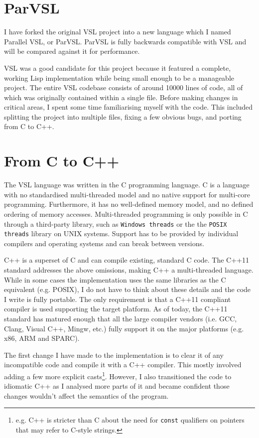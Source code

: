 \section{ParVSL}
I have forked the original VSL project into a new language which I named Parallel VSL, or ParVSL.
ParVSL is fully backwards compatible with VSL and will be compared against it for performance.

VSL was a good candidate for this project because it featured a complete, working Lisp implementation while being
small enough to be a manageable project. The entire VSL codebase consists of around 10000 lines of code, all of which
was originally contained within a single file. Before making changes in critical areas, I spent some time familiarising
myself with the code. This included splitting the project into multiple files, fixing a few obvious bugs, and porting
from C to C++.

\section{From C to C++}
The VSL language was written in the C programming language. C is a language with no standardised
multi-threaded model and no native support for multi-core programming. Furthermore, it has no well-defined
memory model, and no defined ordering of memory accesses. Multi-threaded programming
is only possible in C through a third-party library, such as \texttt{Windows threads} or the
the \texttt{POSIX threads} library on UNIX systems. Support has to be provided by individual compilers
and operating systems and can break between versions.

C++ is a superset of C and can compile existing, standard C code. The C++11 standard addresses the
above omissions, making C++ a multi-threaded language. While in some cases the implementation uses the same
libraries as the C equivalent (e.g. POSIX), I do not have to think about these details and the code
I write is fully portable. The only requirement is that a C++11 compliant compiler is used supporting
the target platform. As of today, the C++11 standard has matured enough
that all the large compiler vendors (i.e. GCC, Clang, Visual C++, Mingw, etc.) fully support it on the
major platforms (e.g. x86, ARM and SPARC).

The first change I have made to the implementation is to clear it of any incompatible code and compile it
with a C++ compiler. This mostly involved adding a few more explicit casts\footnote{e.g.
C++ is stricter than C about the need for \texttt{const} qualifiers on pointers that
may refer to C-style strings.}.
However, I also transitioned the code to idiomatic C++ as I analysed more parts of it
and became confident those changes wouldn't affect the semantics of the program.

